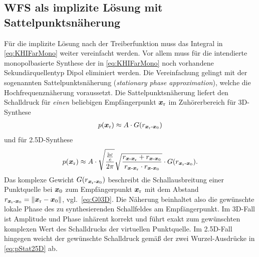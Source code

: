 \subsection{WFS als implizite Lösung mit Sattelpunktsnäherung}
%
Für die implizite Lösung nach der Treiberfunktion muss das Integral
in \Glg\eqref{eq:KHIFarMono} weiter vereinfacht werden.
%
Vor allem muss für die intendierte monopolbasierte Synthese
der in \Glg\eqref{eq:KHIFarMono} noch vorhandene Sekundärquellentyp Dipol
eliminiert werden.
%
Die Vereinfachung gelingt mit der sogenannten Sattelpunktsnäherung
(\textit{stationary phase approximation}), welche
die Hochfrequenznäherung voraussetzt.
%
Die Sattelpunktsnäherung liefert den Schalldruck für \textit{einen} beliebigen
Empfängerpunkt $\bm{x}_\mathrm{r}$ im Zuhörerbereich für 3D-Synthese
%
\begin{align}
\label{eq:pStat3D}
p(\bm{x}_\mathrm{r}) \approx A \cdot G(r_{\bm{x}_\mathrm{r}\text{-}\bm{x}_\mathrm{0}})
\end{align}
%
und für 2.5D-Synthese
%
\begin{align}
\label{eq:pStat25D}
p(\xr) \approx A\cdot
\sqrt{\frac{\frac{\im \omega}{c}}{2\pi}}\sqrt{\frac{r_{\xs\text{-}\xr} + r_{\xs\text{-}\xp}}{r_{\xs\text{-}\xr} \cdot r_{\xs\text{-}\xp}}}\cdot G(r_{\xr\text{-}\xp}).
\end{align}
%
Das komplexe Gewicht $G(r_{\bm{x}_\mathrm{r}\text{-}\bm{x}_\mathrm{0}})$ beschreibt die Schallausbreitung
einer Punktquelle
bei $\bm{x}_\mathrm{0}$ zum Empfängerpunkt $\bm{x}_\mathrm{r}$ mit dem Abstand $r_{\bm{x}_\mathrm{r}\text{-}\bm{x}_\mathrm{0}} = \|\bm{x}_\mathrm{r}-\bm{x}_\mathrm{0}\|$, vgl.~\eqref{eq:G03D}.
%
Die Näherung beinhaltet also die gewünschte lokale Phase des zu synthesierenden
Schallfeldes am Empfängerpunkt.
%
Im 3D-Fall ist Amplitude und Phase inhärent korrekt und führt
exakt zum gewünschten komplexen Wert des Schalldrucks der virtuellen Punktquelle.
%
Im 2.5D-Fall hingegen weicht der gewünschte Schalldruck gemäß der zwei Wurzel-Ausdrücke
in \Glg\eqref{eq:pStat25D} ab.



